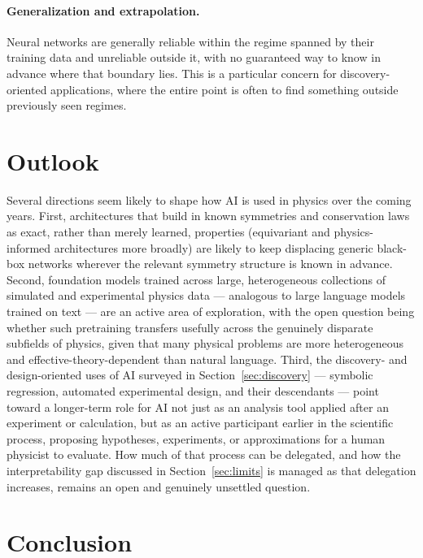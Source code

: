 \documentclass[11pt]{article}
\begin{document}
\paragraph{Generalization and extrapolation.} Neural networks are generally reliable within the regime spanned by their training data and unreliable outside it, with no guaranteed way to know in advance where that boundary lies. This is a particular concern for discovery-oriented applications, where the entire point is often to find something outside previously seen regimes.

\section{Outlook}
\label{sec:outlook}

Several directions seem likely to shape how AI is used in physics over the coming years. First, architectures that build in known symmetries and conservation laws as exact, rather than merely learned, properties (equivariant and physics-informed architectures more broadly) are likely to keep displacing generic black-box networks wherever the relevant symmetry structure is known in advance. Second, foundation models trained across large, heterogeneous collections of simulated and experimental physics data --- analogous to large language models trained on text --- are an active area of exploration, with the open question being whether such pretraining transfers usefully across the genuinely disparate subfields of physics, given that many physical problems are more heterogeneous and effective-theory-dependent than natural language. Third, the discovery- and design-oriented uses of AI surveyed in Section~\ref{sec:discovery} --- symbolic regression, automated experimental design, and their descendants --- point toward a longer-term role for AI not just as an analysis tool applied after an experiment or calculation, but as an active participant earlier in the scientific process, proposing hypotheses, experiments, or approximations for a human physicist to evaluate. How much of that process can be delegated, and how the interpretability gap discussed in Section~\ref{sec:limits} is managed as that delegation increases, remains an open and genuinely unsettled question.

\section{Conclusion}
\end{document}
